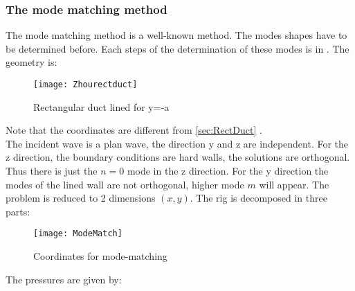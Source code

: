 \subsubsection{The mode matching method}
The mode matching method is a well-known method. The modes shapes have to be determined before. Each steps of the determination of these modes is in . The geometry is: 
\begin{figure}[H] \centering
    \texttt{[image: Zhourectduct]}
    \caption{Rectangular duct lined for y=-a}
\end{figure}
\noindent Note that the coordinates are different from \ref{sec:RectDuct} .\\
The incident wave is a plan wave, the direction y and z are independent. For the z direction, the boundary conditions are hard walls, the solutions are orthogonal. Thus there is just the $n=0$ mode in the z direction. For the y direction the modes of the lined wall are not orthogonal, higher mode $m$ will appear. The problem is reduced to 2 dimensions $(x,y)$.
The rig is decomposed in three parts:
\begin{figure}[H] \centering
    \texttt{[image: ModeMatch]}
    \caption{Coordinates for mode-matching }
\end{figure}
The pressures are given by:
